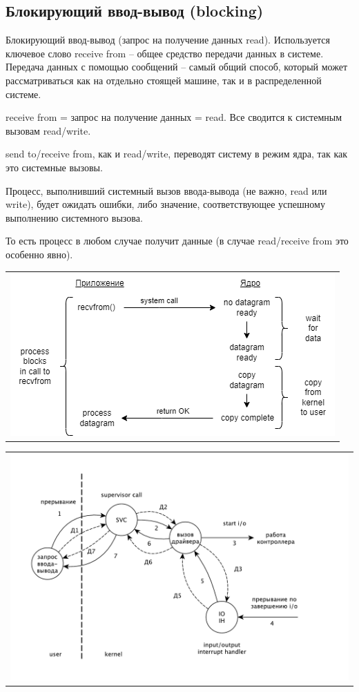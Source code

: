 \subsection{Блокирующий ввод-вывод (blocking)}
Блокирующий ввод-вывод (запрос на получение данных read). Используется ключевое слово receive from – общее средство передачи данных в системе.
Передача данных с помощью сообщений – самый общий способ, который может рассматриваться как на отдельно стоящей машине, так и в распределенной системе. 

receive from = запрос на получение данных = read. Все сводится к системным вызовам read/write.

send to/receive from, как и read/write, переводят систему в режим ядра, так как это системные вызовы.

Процесс, выполнивший системный вызов ввода-вывода (не важно, read или write), будет ожидать ошибки, либо значение, соответствующее успешному выполнению системного вызова.

То есть процесс в любом случае получит данные (в случае read/receive from это особенно явно).

\begin{table}[H]
  \centering
  \begin{tabular}{p{1\linewidth}}
    \centering
    \includegraphics[width=0.8\linewidth]{./images/1-1.png}
  \end{tabular}
\end{table}

\begin{table}[H]
  \centering
  \begin{tabular}{p{1\linewidth}}
    \centering
    \includegraphics[width=0.8\linewidth]{./images/driver.pdf}
  \end{tabular}
\end{table}

